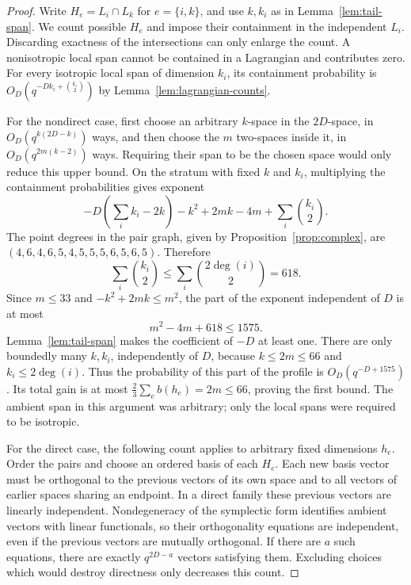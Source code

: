 \begin{proof}
Write $H_e=L_i\cap L_k$ for $e=\{i,k\}$, and use $k,k_i$ as in
Lemma~\ref{lem:tail-span}.  We count possible $H_e$ and impose their
containment in the independent $L_i$.  Discarding exactness of the
intersections can only enlarge the count.  A nonisotropic local span
cannot be contained in a Lagrangian and contributes zero.  For every
isotropic local span of dimension $k_i$, its containment probability
is $O_D(q^{-Dk_i+\binom{k_i}{2}})$ by
Lemma~\ref{lem:lagrangian-counts}.

For the nondirect case, first choose an arbitrary $k$-space in the
$2D$-space, in $O_D(q^{k(2D-k)})$ ways, and then choose the $m$
two-spaces inside it, in $O_D(q^{2m(k-2)})$ ways.  Requiring their
span to be the chosen space would only reduce this upper bound.  On
the stratum with fixed $k$ and $k_i$, multiplying the containment
probabilities gives exponent
\[
 -D\left(\sum_i k_i-2k\right)
 -k^2+2mk-4m+\sum_i\binom{k_i}{2}.
\]
The point degrees in the pair graph, given by
Proposition~\ref{prop:complex}, are
$(4,6,4,6,5,4,5,5,5,6,5,6,5)$.  Therefore
\[
 \sum_i\binom{k_i}{2}
 \le\sum_i\binom{2\deg(i)}2=618.
\]
Since $m\le33$ and $-k^2+2mk\le m^2$, the part of the exponent
independent of $D$ is at most
\[
 m^2-4m+618\le1575.
\]
Lemma~\ref{lem:tail-span} makes the coefficient of $-D$ at least
one.  There are only boundedly many $k,k_i$, independently of $D$,
because $k\le2m\le66$ and $k_i\le2\deg(i)$.  Thus the probability
of this part of the profile is $O_D(q^{-D+1575})$.
Its total gain is at most $\tfrac23\sum_e b(h_e)=2m\le66$, proving
the first bound.  The ambient span in this argument was arbitrary;
only the local spans were required to be isotropic.

For the direct case, the following count applies to arbitrary fixed
dimensions $h_e$.  Order the pairs and choose an ordered basis of
each $H_e$.  Each new basis vector must be orthogonal to the previous
vectors of its own space and to all vectors of earlier spaces sharing
an endpoint.  In a direct family these previous vectors are linearly
independent.  Nondegeneracy of the symplectic form identifies ambient
vectors with linear functionals, so their orthogonality equations are
independent, even if the previous vectors are mutually orthogonal.
If there are $a$ such equations, there are exactly $q^{2D-a}$ vectors
satisfying them.  Excluding choices which would destroy directness
only decreases this count.


\end{proof}
